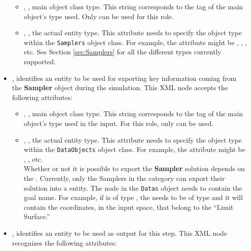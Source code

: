 \begin{itemize}
\begin{itemize}
  \item {}, , main object class
    type.
    This string corresponds to the tag of the main object's type used.
    Only  can be used for this role.
  \item {}, , the actual entity
    type.
    This attribute needs to specify the object type within the \texttt{Samplers}
    object class.
    For example, the  attribute might be ,
   , , etc.
    See Section \ref{sec:Samplers} for all the different types currently
    supported.
\end{itemize}
\item {},  identifies
an entity to be used for exporting key information coming from the
\textbf{Sampler} object during the simulation.
This XML node accepts the following attributes:
\begin{itemize}
  \item {}, , main object class
    type.
    This string corresponds to the tag of the main object's type used in the
    input.
    For this role, only  can be used.
  \item {}, , the actual entity
    type.
    This attribute needs to specify the object type within the \texttt{DataObjects} 
    object class.
    For example, the  attribute might be , 
    , etc. \\
    \nb Whether or not it is possible to export the \textbf{Sampler} solution
    depends on the .
    Currently, only the Samplers in the  category can
    export their solution into a  entity. The  node 
    in the \texttt{Datas} object needs to contain the goal   name. 
    For example, if   is of type , the 
     needs to be of type  and 
    it will contain the coordinates, in the input space, that belong to the
    ``Limit Surface.'' 
\end{itemize}
\item {},  identifies an
entity to be used as output for this step.
This XML node recognizes the following attributes:

\end{itemize}
